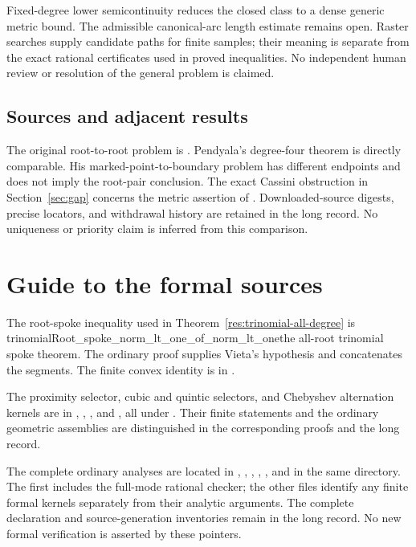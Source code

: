 \documentclass[11pt]{article}
\begin{document}
Fixed-degree lower semicontinuity reduces the closed class to a dense generic
metric bound.  The admissible canonical-arc length estimate remains open.
Raster searches supply candidate paths for finite samples; their meaning is
separate from the exact rational certificates used in proved inequalities.
No independent human review or resolution of the general problem is claimed.

\subsection*{Sources and adjacent results}\label{sec:1041-sources}

The original root-to-root problem is \cite[p.~139, Problem~5]{ehp1958}.
Pendyala's degree-four theorem \cite[Thm.~1]{june2026} is directly comparable.
His marked-point-to-boundary problem \cite{pendyala2026shortest} has different
endpoints and does not imply the root-pair conclusion.  The exact Cassini
obstruction in Section~\ref{sec:gap} concerns the metric assertion of
\cite[Prop.~12]{march2026}.  Downloaded-source digests, precise locators,
and withdrawal history are retained in the long record.  No uniqueness or
priority claim is inferred from this comparison.

\appendix
\section{Guide to the formal sources}\label{app:sources}

The root-spoke inequality used in Theorem~\ref{res:trinomial-all-degree} is
{trinomialRoot_spoke_norm_lt_one_of_norm_lt_one}{the all-root trinomial spoke theorem}.
The ordinary proof supplies Vieta's hypothesis and concatenates the segments.
The finite convex identity is in
.

The proximity selector, cubic and quintic selectors, and Chebyshev alternation
kernels are in
,
,
,
 and
, all under
.
Their finite statements and the ordinary geometric assemblies are distinguished
in the corresponding proofs and the long record.

The complete ordinary analyses are located in
,
,
,
,
,
 and
 in the same directory.
The first includes the full-mode rational checker; the other files identify
any finite formal kernels separately from their analytic arguments.
The complete declaration and source-generation inventories remain in the
long record.  No new formal verification is asserted by these pointers.
\end{document}
